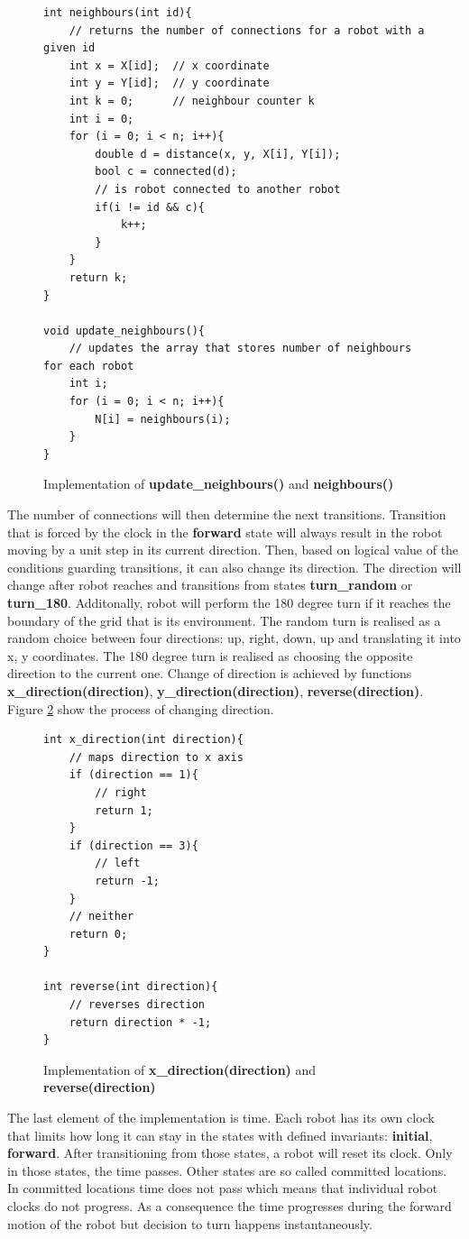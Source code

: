 \begin{figure}[H]
\caption{Implementation of \textbf{update\_neighbours()} and \textbf{neighbours()}}
\lstset { language=C++ }
\begin{lstlisting}
int neighbours(int id){
    // returns the number of connections for a robot with a given id
    int x = X[id];  // x coordinate
    int y = Y[id];  // y coordinate
    int k = 0;      // neighbour counter k
    int i = 0;   
    for (i = 0; i < n; i++){
        double d = distance(x, y, X[i], Y[i]);
        bool c = connected(d);
        // is robot connected to another robot
        if(i != id && c){
            k++;
        }
    }
    return k;
}

void update_neighbours(){
    // updates the array that stores number of neighbours for each robot
    int i;
    for (i = 0; i < n; i++){
        N[i] = neighbours(i);
    }
}
\end{lstlisting}
\label{fig:neighbours}
\end{figure}
\noindent
The number of connections will then determine the next transitions. Transition that is forced by the clock in the \textbf{forward} state will always result in the robot moving by a unit step in its current direction. Then, based on logical value of the conditions guarding transitions, it can also change its direction. The direction will change after robot reaches and transitions from states \textbf{turn\_random} or \textbf{turn\_180}. Additonally, robot will perform the 180 degree turn if it reaches the boundary of the grid that is its environment. The random turn is realised as a random choice between four directions: up, right, down, up and translating it into x, y coordinates. The 180 degree turn is realised as choosing the opposite direction to the current one. Change of direction is achieved by functions \textbf{x\_direction(direction)}, \textbf{y\_direction(direction)}, \textbf{reverse(direction)}. Figure \ref{fig:direction} show the process of changing direction.
\begin{figure}[H]
\caption{Implementation of \textbf{x\_direction(direction)} and \textbf{reverse(direction)}}
\lstset { language=C++ }
\begin{lstlisting}
int x_direction(int direction){
    // maps direction to x axis
    if (direction == 1){
        // right
        return 1;
    }
    if (direction == 3){
        // left
        return -1;
    }
    // neither
    return 0;
}

int reverse(int direction){
    // reverses direction
    return direction * -1;
}
\end{lstlisting}
\label{fig:direction}
\end{figure}
\noindent
The last element of the implementation is time. Each robot has its own clock that limits how long it can stay in the states with defined invariants: \textbf{initial}, \textbf{forward}. After transitioning from those states, a robot will reset its clock. Only in those states, the time passes. Other states are so called committed locations. In committed locations time does not pass which means that individual robot clocks do not progress. As a consequence the time progresses during the forward motion of the robot but decision to turn happens instantaneously.


